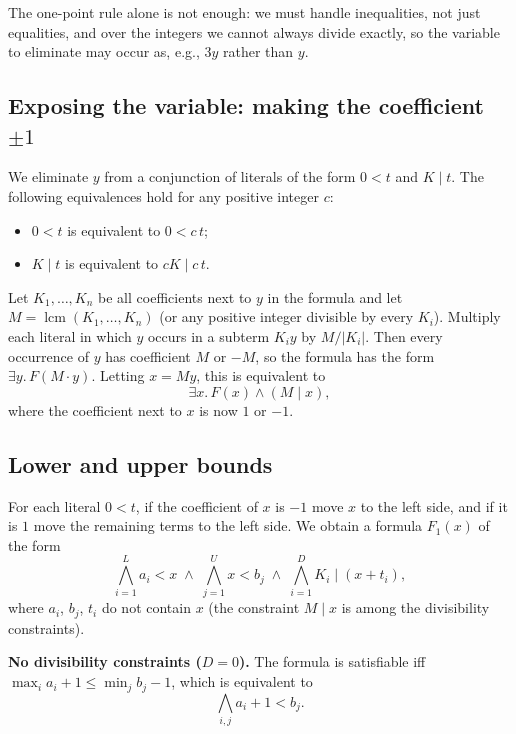 The one-point rule alone is not enough: we must handle inequalities, not just equalities, and over the integers we cannot always divide exactly, so the variable to eliminate may occur as, e.g., $3y$ rather than $y$.

 
\subsection{Exposing the variable: making the coefficient $\pm 1$}
 
We eliminate $y$ from a conjunction of literals of the form $0 < t$ and $K \mid t$. The following equivalences hold for any positive integer $c$:
\begin{itemize}
  \item $0 < t$ is equivalent to $0 < c\,t$;
  \item $K \mid t$ is equivalent to $c K \mid c\,t$.
\end{itemize}
Let $K_1, \ldots, K_n$ be all coefficients next to $y$ in the formula and let $M = \operatorname{lcm}(K_1, \ldots, K_n)$ (or any positive integer divisible by every $K_i$). Multiply each literal in which $y$ occurs in a subterm $K_i y$ by $M/|K_i|$. Then every occurrence of $y$ has coefficient $M$ or $-M$, so the formula has the form $\exists y.\, F(M \cdot y)$. Letting $x = M y$, this is equivalent to
\[
\exists x.\, F(x) \wedge (M \mid x),
\]
where the coefficient next to $x$ is now $1$ or $-1$.
 
\subsection{Lower and upper bounds}
 
For each literal $0 < t$, if the coefficient of $x$ is $-1$ move $x$ to the left side, and if it is $1$ move the remaining terms to the left side. We obtain a formula $F_1(x)$ of the form
\[
\bigwedge_{i=1}^{L} a_i < x \;\wedge\; \bigwedge_{j=1}^{U} x < b_j \;\wedge\; \bigwedge_{i=1}^{D} K_i \mid (x + t_i),
\]
where $a_i$, $b_j$, $t_i$ do not contain $x$ (the constraint $M \mid x$ is among the divisibility constraints).
 
\textbf{No divisibility constraints ($D = 0$).} The formula is satisfiable iff $\max_i a_i + 1 \le \min_j b_j - 1$, which is equivalent to
\[
\bigwedge_{i,j} a_i + 1 < b_j.
\]
 
